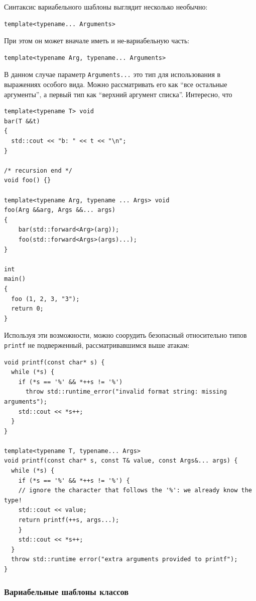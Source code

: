 \documentclass[a4paper,12pt,oneside]{article}
\begin{document}
Синтаксис вариабельного шаблоны выглядит несколько необычно:

\begin{lstlisting}
template<typename... Arguments>
\end{lstlisting}

При этом он может вначале иметь и не-вариабельную часть:

\begin{lstlisting}
template<typename Arg, typename... Arguments>
\end{lstlisting}

В данном случае параметр \lstinline!Arguments...! это тип для использования в выражениях особого вида. Можно рассматривать его как ``все остальные аргументы'', а первый тип как ``верхний аргумент списка''. Интересно, что 

\begin{lstlisting}
template<typename T> void
bar(T &&t)
{
  std::cout << "b: " << t << "\n";
}

/* recursion end */
void foo() {}

template<typename Arg, typename ... Args> void 
foo(Arg &&arg, Args &&... args)
{
    bar(std::forward<Arg>(arg));
    foo(std::forward<Args>(args)...);
}

int 
main()
{
  foo (1, 2, 3, "3");
  return 0;
}
\end{lstlisting}

Используя эти возможности, можно соорудить безопасный относительно типов \lstinline!printf! не подверженный, рассматривавшимся выше атакам:

\begin{lstlisting}
void printf(const char* s) {
  while (*s) {
    if (*s == '%' && *++s != '%') 
      throw std::runtime_error("invalid format string: missing arguments");
    std::cout << *s++;
  }
}

template<typename T, typename... Args>
void printf(const char* s, const T& value, const Args&... args) { 
  while (*s) { 
    if (*s == '%' && *++s != '%') {
    // ignore the character that follows the '%': we already know the type!
    std::cout << value;
    return printf(++s, args...);
    }
    std::cout << *s++;
  }
  throw std::runtime error("extra arguments provided to printf");
}
\end{lstlisting}

\subsubsection{Вариабельные шаблоны классов}
\end{document}

